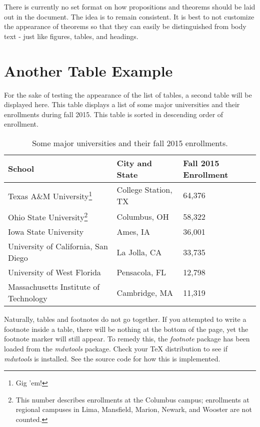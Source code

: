 There is currently no set format on how propositions and theorems should be laid out in the document. The idea is to remain consistent. It is best to not customize the appearance of theorems so that they can easily be distinguished from body text - just like figures, tables, and headings.

\section{Another Table Example}
For the sake of testing the appearance of the list of tables, a second table will be displayed here. This table displays a list of some major universities and their enrollments during fall 2015. This table is sorted in descending order of enrollment.
\begin{savenotes}
\begin{table}[h!]
	\centering
	\label{my-label}
	\begin{tabular}{|l|l|l|}
		\hline
		School & City and State & Fall 2015 Enrollment  \\ \hline
		Texas A\&M University\footnote{Gig 'em!} & College Station, TX & 64,376  \\ \hline
		Ohio State University\footnote{This number describes enrollments at the Columbus campus; enrollments at regional campuses in Lima, Mansfield, Marion, Newark, and Wooster are not counted.} & Columbus, OH & 58,322 \\ \hline
		Iowa State University & Ames, IA & 36,001 \\ \hline
		University of California, San Diego & La Jolla, CA & 33,735   \\ \hline
		University of West Florida & Pensacola, FL & 12,798 \\ \hline
		Massachusetts Institute of Technology & Cambridge, MA & 11,319   \\ \hline
	\end{tabular}
	\caption{Some major universities and their fall 2015 enrollments.}
\end{table}
\end{savenotes}

Naturally, tables and footnotes do not go together. If you attempted to write a footnote inside a table, there will be nothing at the bottom of the page, yet the footnote marker will still appear. To remedy this, the \textit{footnote} package has been loaded from the \textit{mdwtools} package. Check your TeX distribution to see if \textit{mdwtools} is installed. See the source code for how this is implemented.